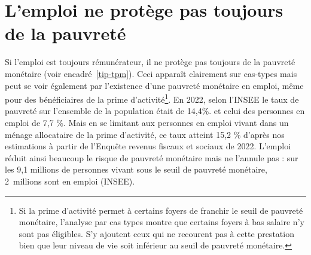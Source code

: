 \documentclass[
  french,
]{article}
\begin{document}
\section{L'emploi ne protège pas toujours de la
pauvreté}\label{lemploi-ne-protuxe8ge-pas-toujours-de-la-pauvretuxe9}

Si l'emploi est toujours rémunérateur, il ne protège pas toujours de la
pauvreté monétaire (voir encadré~\ref{tip-tpm}). Ceci apparaît
clairement sur cas-types mais peut se voir également par l'existence
d'une pauvreté monétaire en emploi, même pour des bénéficiaires de la
prime d'activité\footnote{Si la prime d'activité permet à certains
  foyers de franchir le seuil de pauvreté monétaire, l'analyse par cas
  types montre que certains foyers à bas salaire n'y sont pas éligibles.
  S'y ajoutent ceux qui ne recourent pas à cette prestation bien que
  leur niveau de vie soit inférieur au seuil de pauvreté monétaire.}. En
2022, selon l'INSEE le taux de pauvreté sur l'ensemble de la population
était de 14,4\%. et celui des personnes en emploi de 7,7 \%. Mais en se
limitant aux personnes en emploi vivant dans un ménage allocataire de la
prime d'activité, ce taux atteint 15,2 \% d'après nos estimations à
partir de l'Enquête revenus fiscaux et sociaux de 2022. L'emploi réduit
ainsi beaucoup le risque de pauvreté monétaire mais ne l'annule pas :
sur les 9,1 millions de personnes vivant sous le seuil de pauvreté
monétaire, 2~millions sont en emploi (INSEE).
\end{document}
